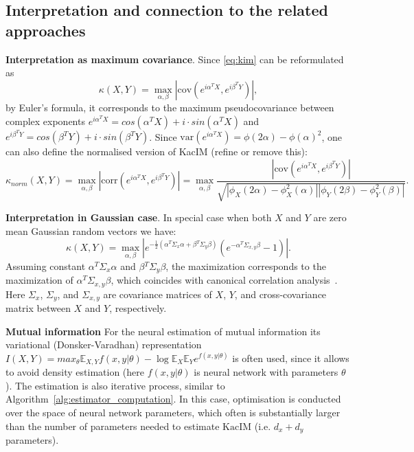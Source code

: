 \documentclass{article}
\newcommand{\cov}{\mathrm{cov}}
\newcommand{\corr}{\mathrm{corr}}
\newcommand{\var}{\mathrm{var}}
\newcommand{\KacIM}{\mathrm{KacIM}}
\begin{document}
{\subsection{Interpretation and connection to the related approaches}
\textbf{Interpretation as maximum covariance}. Since \eqref{eq:kim} can be reformulated as
\begin{equation}
\kappa(X,Y) = \max_{\alpha,\beta} |\cov(e^{i\alpha^{T}X},e^{i\beta^{T}Y})|,
\end{equation}
by Euler's formula, it corresponds to the maximum pseudocovariance between complex exponents $e^{i\alpha^{T}X} = cos(\alpha^{T}X) + i \cdot sin(\alpha^{T}X)$ and $e^{i\beta^{T}Y} = cos(\beta^{T}Y) + i \cdot sin(\beta^{T}Y)$.
Since $\var(e^{i\alpha^{T}X}) = \phi(2\alpha) - \phi(\alpha)^2$, one can also define the normalised version of KacIM (refine or remove this):
\begin{equation}
\kappa_{norm}(X,Y) = \max_{\alpha,\beta} |\corr(e^{i\alpha^{T}X},e^{i\beta^{T}Y})| = \max_{\alpha,\beta}  \frac{|\cov(e^{i\alpha^{T}X},e^{i\beta^{T}Y})|}{\sqrt{|\phi_{X}(2\alpha)-\phi_{X}^{2}(\alpha)||\phi_{Y}(2\beta)-\phi_{Y}^{2}(\beta)|}}.
\end{equation}


\textbf{Interpretation in Gaussian case}. In special case when both $X$ and $Y$ are zero mean Gaussian random vectors we have:
\begin{equation}
\label{eq:gaussian_kacim}
\kappa(X,Y) = \max_{\alpha, \beta} | e^{-\frac{1}{2} (\alpha^{T}\Sigma_{x}\alpha + \beta{^T}\Sigma_{y}\beta)}(e^{-\alpha{^T}\Sigma_{x,y}\beta} - 1)|.
\end{equation}
Assuming constant $\alpha^{T}\Sigma_{x}\alpha$ and  $\beta{^T}\Sigma_{y}\beta$, the maximization corresponds to the maximization of  $\alpha{^T}\Sigma_{x,y}\beta$, which coincides with canonical correlation analysis~\cite{10.5555/3279302}. Here $\Sigma_{x}$, $\Sigma_{y}$, and  $\Sigma_{x,y}$ are covariance matrices of $X$, $Y$, and cross-covariance matrix between $X$ and $Y$, respectively. %



\textbf{Mutual information} For the neural estimation of mutual information its variational (Donsker-Varadhan) representation $I(X,Y) = max_{\theta}  \mathbb{E}_{X,Y} f(x,y|\theta) - \log \mathbb{E}_{X}\mathbb{E}_{Y} e^{f(x,y|\theta)}$  \cite{pmlr-v80-belghazi18a} is often used, since it allows to avoid density estimation (here $f(x,y|\theta)$ is neural network with parameters $\theta$). The estimation is also iterative process, similar to Algorithm~\ref{alg:estimator_computation}. In this case, optimisation is conducted over the space of neural network parameters, which often is substantially larger than the number of parameters needed to estimate $\KacIM$ (i.e. $d_{x} + d_{y}$ parameters).


}
\end{document}
